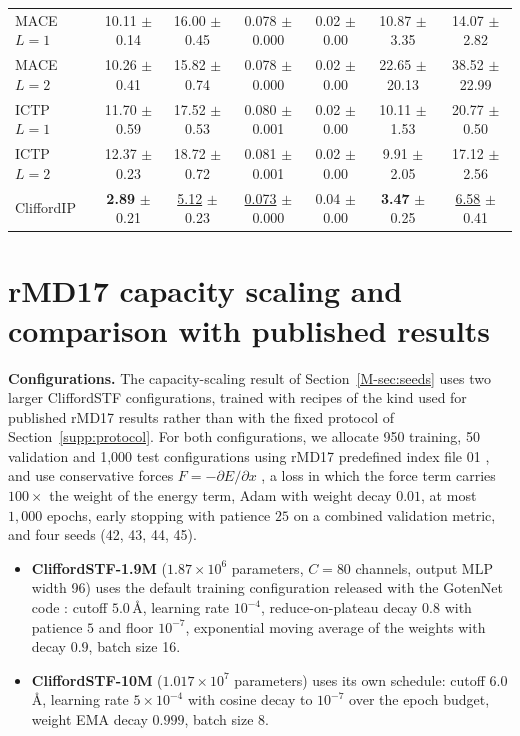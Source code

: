 \begin{table}[!htbp]
\begin{tabular*}{\textwidth}{@{\extracolsep{\fill}}lcccccc@{}}
MACE $L{=}1$ & 10.11 $\pm$ 0.14 & 16.00 $\pm$ 0.45 & 0.078 $\pm$ 0.000 & 0.02 $\pm$ 0.00 & 10.87 $\pm$ 3.35 & 14.07 $\pm$ 2.82 \\
MACE $L{=}2$ & 10.26 $\pm$ 0.41 & 15.82 $\pm$ 0.74 & 0.078 $\pm$ 0.000 & 0.02 $\pm$ 0.00 & 22.65 $\pm$ 20.13 & 38.52 $\pm$ 22.99 \\
ICTP $L{=}1$ & 11.70 $\pm$ 0.59 & 17.52 $\pm$ 0.53 & 0.080 $\pm$ 0.001 & 0.02 $\pm$ 0.00 & 10.11 $\pm$ 1.53 & 20.77 $\pm$ 0.50 \\
ICTP $L{=}2$ & 12.37 $\pm$ 0.23 & 18.72 $\pm$ 0.72 & 0.081 $\pm$ 0.001 & 0.02 $\pm$ 0.00 & 9.91 $\pm$ 2.05 & 17.12 $\pm$ 2.56 \\
CliffordIP & \textbf{2.89} $\pm$ 0.21 & \underline{5.12} $\pm$ 0.23 & \underline{0.073} $\pm$ 0.000 & 0.04 $\pm$ 0.00 & \textbf{3.47} $\pm$ 0.25 & \underline{6.58} $\pm$ 0.41 \\
\bottomrule
\end{tabular*}
\end{table}

\section{rMD17 capacity scaling and comparison with published results}\label{supp:published}

\textbf{Configurations.} The capacity-scaling result of Section~\ref{M-sec:seeds} uses two larger CliffordSTF configurations, trained with recipes of the kind used for published rMD17 results rather than with the fixed protocol of Section~\ref{supp:protocol}. For both configurations, we allocate 950 training, 50 validation and 1{,}000 test configurations using rMD17 predefined index file 01 \cite{christensen2020role}, and use conservative forces $F=-\partial E/\partial x$ \citep{chmiela2017conservative}, a loss in which the force term carries $100\times$ the weight of the energy term, Adam with weight decay $0.01$, at most $1{,}000$ epochs, early stopping with patience $25$ on a combined validation metric, and four seeds (42, 43, 44, 45).

\begin{itemize}
\item \textbf{CliffordSTF-1.9M} ($1.87\times10^6$ parameters, $C{=}80$ channels, output MLP width 96) uses the default training configuration released with the GotenNet code \citep{aykent2025gotennet}: cutoff $5.0$\,\AA, learning rate $10^{-4}$, reduce-on-plateau decay $0.8$ with patience $5$ and floor $10^{-7}$, exponential moving average of the weights with decay $0.9$, batch size 16.
\item \textbf{CliffordSTF-10M} ($1.017\times10^7$ parameters) uses its own schedule: cutoff $6.0$\,\AA, learning rate $5\times10^{-4}$ with cosine decay to $10^{-7}$ over the epoch budget, weight EMA decay $0.999$, batch size 8.
\end{itemize}

